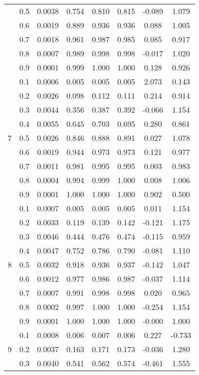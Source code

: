 \documentclass[11pt,a4paper]{report}
\begin{document}
\begin{longtable}{ | c | c || c | c | c | c | c | c | }
 & 0.5 & 0.0038 & 0.754 & 0.810 & 0.815 & -0.089 & 1.079 \\
 & 0.6 & 0.0019 & 0.889 & 0.936 & 0.936 & 0.088 & 1.005 \\
 & 0.7 & 0.0018 & 0.961 & 0.987 & 0.985 & 0.085 & 0.917 \\
 & 0.8 & 0.0007 & 0.989 & 0.998 & 0.998 & -0.017 & 1.020 \\
 & 0.9 & 0.0001 & 0.999 & 1.000 & 1.000 & 0.128 & 0.926 \\
 \hline
\multirow{9}{*}{7} & 0.1 & 0.0006 & 0.005 & 0.005 & 0.005 & 2.073 & 0.143 \\
 & 0.2 & 0.0026 & 0.098 & 0.112 & 0.111 & 0.214 & 0.914 \\
 & 0.3 & 0.0044 & 0.356 & 0.387 & 0.392 & -0.066 & 1.154 \\
 & 0.4 & 0.0055 & 0.645 & 0.703 & 0.695 & 0.280 & 0.861 \\
 & 0.5 & 0.0026 & 0.846 & 0.888 & 0.891 & 0.027 & 1.078 \\
 & 0.6 & 0.0019 & 0.944 & 0.973 & 0.973 & 0.121 & 0.977 \\
 & 0.7 & 0.0011 & 0.981 & 0.995 & 0.995 & 0.003 & 0.983 \\
 & 0.8 & 0.0004 & 0.994 & 0.999 & 1.000 & 0.008 & 1.006 \\
 & 0.9 & 0.0001 & 1.000 & 1.000 & 1.000 & 0.902 & 0.500 \\
 \hline
\multirow{9}{*}{8} & 0.1 & 0.0007 & 0.005 & 0.005 & 0.005 & 0.011 & 1.154 \\
 & 0.2 & 0.0033 & 0.119 & 0.139 & 0.142 & -0.121 & 1.175 \\
 & 0.3 & 0.0046 & 0.444 & 0.476 & 0.474 & -0.115 & 0.959 \\
 & 0.4 & 0.0047 & 0.752 & 0.786 & 0.790 & -0.081 & 1.110 \\
 & 0.5 & 0.0032 & 0.918 & 0.936 & 0.937 & -0.142 & 1.047 \\
 & 0.6 & 0.0012 & 0.977 & 0.986 & 0.987 & -0.037 & 1.114 \\
 & 0.7 & 0.0007 & 0.991 & 0.998 & 0.998 & 0.020 & 0.965 \\
 & 0.8 & 0.0002 & 0.997 & 1.000 & 1.000 & -0.254 & 1.154 \\
 & 0.9 & 0.0001 & 1.000 & 1.000 & 1.000 & -0.000 & 1.000 \\
 \hline
\multirow{9}{*}{9} & 0.1 & 0.0008 & 0.006 & 0.007 & 0.006 & 0.227 & -0.733 \\
 & 0.2 & 0.0037 & 0.163 & 0.171 & 0.173 & -0.036 & 1.280 \\
 & 0.3 & 0.0040 & 0.541 & 0.562 & 0.574 & -0.461 & 1.555 \\

\end{longtable}
\end{document}
